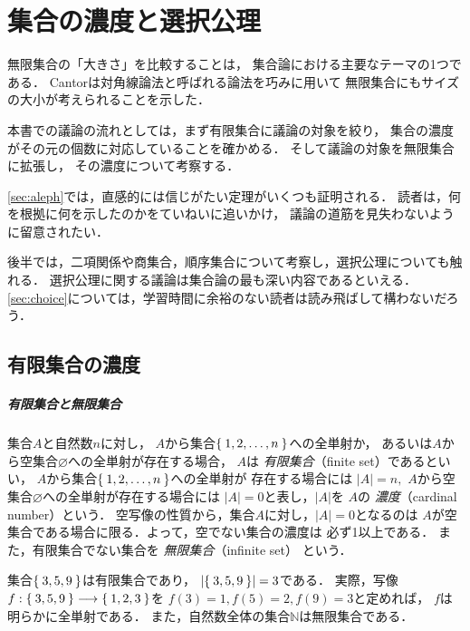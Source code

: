 \chapter{集合の濃度と選択公理}
\label{chp:cardinal}
 無限集合の「大きさ」を比較することは，
 集合論における主要なテーマの1つである．
 Cantorは対角線論法と呼ばれる論法を巧みに用いて
 無限集合にもサイズの大小が考えられることを示した．
 
 本書での議論の流れとしては，まず有限集合に議論の対象を絞り，
 集合の濃度がその元の個数に対応していることを確かめる．
 そして議論の対象を無限集合に拡張し，
 その濃度について考察する．

 \ref{sec:aleph}では，直感的には信じがたい定理がいくつも証明される．
 読者は，何を根拠に何を示したのかをていねいに追いかけ，
 議論の道筋を見失わないように留意されたい．

 後半では，二項関係や商集合，順序集合について考察し，選択公理についても触れる．
 選択公理に関する議論は集合論の最も深い内容であるといえる．
 \ref{sec:choice}については，学習時間に余裕のない読者は読み飛ばして構わないだろう．
%
 \section{有限集合の濃度}
 \label{sec:cardinal}
  \paragraph{有限集合と無限集合}
   集合$A$と自然数$n$に対し，
   $A$から集合$\Set{ 1,  2,  \ldots , n}$への全単射か，
   あるいは$A$から空集合$\varnothing$への全単射が存在する場合，
   $A$は
   \emph{有限集合}（finite set）であるといい，
   $A$から集合$\Set{ 1,  2,  \ldots ,  n }$への全単射が
   存在する場合には
   $\lvert A \rvert = n,$
   $A$から空集合$\varnothing$への全単射が存在する場合には
   $\lvert A \rvert =0$と表し，$\lvert A \rvert$を
   $A$の
   \emph{濃度}（cardinal number）という．
   空写像の性質から，集合$A$に対し，$\lvert A \lvert = 0$となるのは
   $A$が空集合である場合に限る．よって，空でない集合の濃度は
   必ず1以上である．
   また，有限集合でない集合を
   \emph{無限集合}（infinite set）
   という．

   \begin{ex} \label{ex:finiteset}
     集合$\Set { 3,  5,  9}$は有限集合であり，
     $\lvert \Set{ 3,  5,  9} \rvert = 3$である．
     実際，写像$f: \Set{3,5,9} \longrightarrow \Set{ 1,2,3}$を
     $f(3)=1,  f(5)=2 ,  f(9)=3$と定めれば，
     $f$は明らかに全単射である．
     また，自然数全体の集合$\mathbb{N}$は無限集合である．
   \end{ex}

